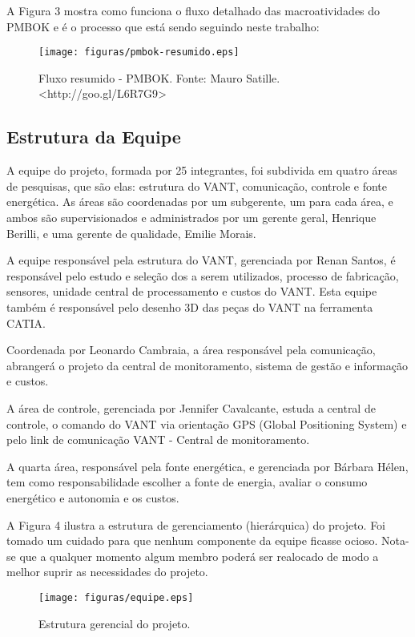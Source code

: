A Figura 3 mostra como funciona o fluxo detalhado das macroatividades do PMBOK e é o processo que está sendo seguindo neste trabalho:

\begin{figure}[ht]
	\centering
		\texttt{[image: figuras/pmbok-resumido.eps]}
	\caption{Fluxo resumido - PMBOK. Fonte: Mauro Satille. <http://goo.gl/L6R7G9>}
\end{figure}

\subsection{Estrutura da Equipe}
A equipe do projeto, formada por 25 integrantes, foi subdivida em quatro áreas de pesquisas, que são elas: estrutura do VANT, comunicação, controle e fonte energética. As áreas são coordenadas por um subgerente, um para cada área, e ambos são supervisionados e administrados por um gerente geral, Henrique Berilli, e uma gerente de qualidade, Emilie Morais.

A equipe responsável pela estrutura do VANT, gerenciada por Renan Santos, é responsável pelo estudo e seleção dos a serem utilizados, processo de fabricação, sensores, unidade central de processamento e custos do VANT. Esta equipe também é responsável pelo desenho 3D das peças do VANT na ferramenta CATIA.  
	
Coordenada por Leonardo Cambraia, a área responsável pela comunicação, abrangerá o projeto da central de monitoramento, sistema de gestão e informação e custos.
	
A área de controle, gerenciada por Jennifer Cavalcante, estuda a central de controle, o comando do VANT via orientação GPS (Global Positioning System) e pelo link de comunicação VANT - Central de monitoramento.
	
A quarta área, responsável pela fonte energética, e gerenciada por Bárbara Hélen, tem como responsabilidade escolher a fonte de energia, avaliar o consumo energético e autonomia e os custos.
	
A Figura 4 ilustra a estrutura de gerenciamento (hierárquica) do projeto. Foi tomado um cuidado para que nenhum componente da equipe ficasse ocioso. Nota-se que a qualquer momento algum membro poderá ser realocado de modo a melhor suprir as necessidades do projeto.

\begin{figure}[ht]
	\centering
		\texttt{[image: figuras/equipe.eps]}
	\caption{Estrutura gerencial do projeto.}
\end{figure}


